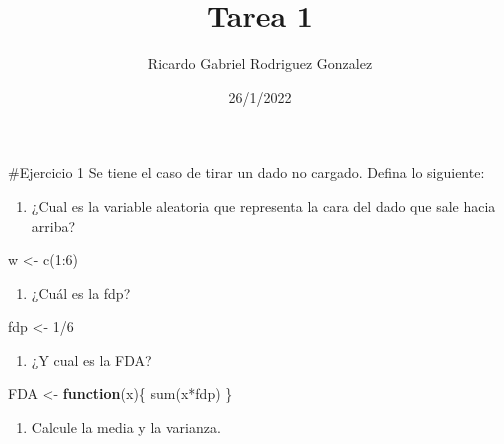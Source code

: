 \documentclass[
]{article}
\title{Tarea 1}
\author{Ricardo Gabriel Rodriguez Gonzalez}
\date{26/1/2022}
\newenvironment{Shaded}{\begin{snugshade}}{\end{snugshade}}
\newcommand{\ControlFlowTok}[1]{\textcolor[rgb]{0.13,0.29,0.53}{\textbf{#1}}}
\newcommand{\DecValTok}[1]{\textcolor[rgb]{0.00,0.00,0.81}{#1}}
\newcommand{\FunctionTok}[1]{\textcolor[rgb]{0.00,0.00,0.00}{#1}}
\newcommand{\NormalTok}[1]{#1}
\newcommand{\OtherTok}[1]{\textcolor[rgb]{0.56,0.35,0.01}{#1}}
\newcommand{\SpecialCharTok}[1]{\textcolor[rgb]{0.00,0.00,0.00}{#1}}
\providecommand{\tightlist}{%
  \setlength{\itemsep}{0pt}\setlength{\parskip}{0pt}}
\begin{document}
\maketitle

\#Ejercicio 1 Se tiene el caso de tirar un dado no cargado. Defina lo
siguiente:

\begin{enumerate}
\def\labelenumi{\alph{enumi})}
\tightlist
\item
  ¿Cual es la variable aleatoria que representa la cara del dado que
  sale hacia arriba?
\end{enumerate}

\begin{Shaded}
\begin{Highlighting}[]
\NormalTok{w }\OtherTok{\textless{}{-}} \FunctionTok{c}\NormalTok{(}\DecValTok{1}\SpecialCharTok{:}\DecValTok{6}\NormalTok{)}
\end{Highlighting}
\end{Shaded}

\begin{enumerate}
\def\labelenumi{\alph{enumi})}
\setcounter{enumi}{1}
\tightlist
\item
  ¿Cuál es la fdp?
\end{enumerate}

\begin{Shaded}
\begin{Highlighting}[]
\NormalTok{fdp }\OtherTok{\textless{}{-}} \DecValTok{1}\SpecialCharTok{/}\DecValTok{6}
\end{Highlighting}
\end{Shaded}

\begin{enumerate}
\def\labelenumi{\alph{enumi})}
\setcounter{enumi}{2}
\tightlist
\item
  ¿Y cual es la FDA?
\end{enumerate}

\begin{Shaded}
\begin{Highlighting}[]
\NormalTok{FDA }\OtherTok{\textless{}{-}} \ControlFlowTok{function}\NormalTok{(x)\{}
  \FunctionTok{sum}\NormalTok{(x}\SpecialCharTok{*}\NormalTok{fdp)}
\NormalTok{\}}
\end{Highlighting}
\end{Shaded}

\begin{enumerate}
\def\labelenumi{\alph{enumi})}
\setcounter{enumi}{3}
\tightlist
\item
  Calcule la media y la varianza.
\end{enumerate}
\end{document}
